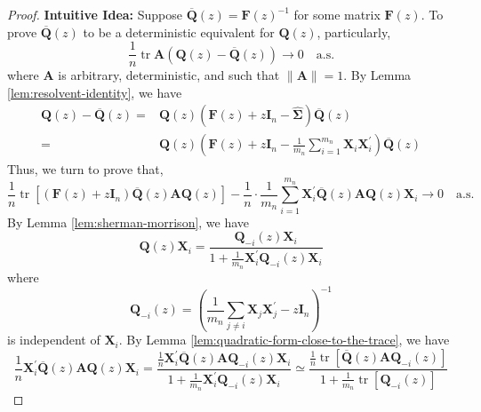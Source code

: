 \begin{proof}
    \textbf{Intuitive Idea:}
    Suppose $\overline{\mathbf{Q}}(z)=\mathbf{F}(z)^{-1}$ for some matrix $\mathbf{F}(z)$. To prove $\overline{\mathbf{Q}}(z)$ to be a deterministic equivalent for $\mathbf{Q}(z)$, particularly,
    \begin{equation*}
        \frac{1}{n}\operatorname{tr}\mathbf{A}(\mathbf{Q}(z)-\overline{\mathbf{Q}}(z))\rightarrow 0\quad\text{a.s.}
    \end{equation*}
    where $\mathbf{A}$ is arbitrary, deterministic, and such that $\|\mathbf{A}\|=1$. By Lemma \ref{lem:resolvent-identity}, we have
    \begin{equation*}
        \begin{aligned}
            \mathbf{Q}(z)-\overline{\mathbf{Q}}(z)= & \mathbf{Q}(z)\left(\mathbf{F}(z)+z\mathbf{I}_{n}-\widehat{\boldsymbol{\Sigma}}\right) \overline{\mathbf{Q}}(z)                                         \\
            =                                       & \mathbf{Q}(z)\left(\mathbf{F}(z)+z\mathbf{I}_{n}-\frac{1}{m_{n}}\sum_{i=1}^{m_{n}}\mathbf{X}_{i}\mathbf{X}_{i}^{\prime}\right)\overline{\mathbf{Q}}(z)
        \end{aligned}
    \end{equation*}
    Thus, we turn to prove that,
    \begin{equation*}
        \frac{1}{n}\operatorname{tr}\left[\left(\mathbf{F}(z)+z\mathbf{I}_{n}\right)\overline{\mathbf{Q}}(z)\mathbf{A}\mathbf{Q}(z)\right]-\frac{1}{n}\cdot\frac{1}{m_{n}}\sum_{i=1}^{m_{n}}\mathbf{X}_{i}^{\prime}\overline{\mathbf{Q}}(z)\mathbf{A}\mathbf{Q}(z)\mathbf{X}_{i}\rightarrow 0\quad\text{a.s.}
    \end{equation*}
    By Lemma \ref{lem:sherman-morrison}, we have
    \begin{equation*}
        \mathbf{Q}(z)\mathbf{X}_{i}=\frac{\mathbf{Q}_{-i}(z)\mathbf{X}_{i}}{1+\frac{1}{m_{n}}\mathbf{X}_{i}^{\prime}\mathbf{Q}_{-i}(z)\mathbf{X}_{i}}
    \end{equation*}
    where
    \begin{equation*}
        \mathbf{Q}_{-i}(z)=\left(\frac{1}{m_{n}}\sum_{j\neq i}\mathbf{X}_{j}\mathbf{X}_{j}^{\prime}-z\mathbf{I}_{n}\right)^{-1}
    \end{equation*}
    is independent of $\mathbf{X}_{i}$. By Lemma \ref{lem:quadratic-form-close-to-the-trace}, we have
    \begin{equation*}
        \frac{1}{n}\mathbf{X}_{i}^{\prime}\overline{\mathbf{Q}}(z)\mathbf{A}\mathbf{Q}(z)\mathbf{X}_{i}=\frac{\frac{1}{n}\mathbf{X}_{i}^{\prime}\overline{\mathbf{Q}}(z)\mathbf{A}\mathbf{Q}_{-i}(z)\mathbf{X}_{i}}{1+\frac{1}{m_{n}}\mathbf{X}_{i}^{\prime}\mathbf{Q}_{-i}(z)\mathbf{X}_{i}}\simeq\frac{\frac{1}{n}\operatorname{tr}\left[\overline{\mathbf{Q}}(z)\mathbf{A}\mathbf{Q}_{-i}(z)\right]}{1+\frac{1}{m_{n}}\operatorname{tr}\left[\mathbf{Q}_{-i}(z)\right]}

\end{equation*}
\end{proof}
